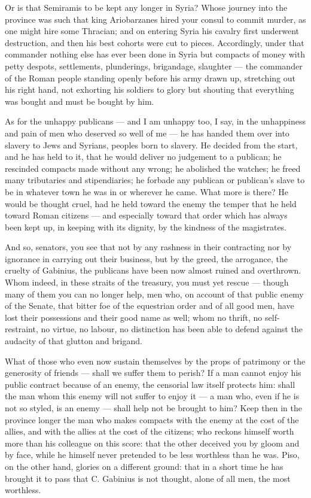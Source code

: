  Or is that Semiramis to be kept any longer in Syria? Whose journey into the province was such that king Ariobarzanes hired your consul to commit murder, as one might hire some Thracian; and on entering Syria his cavalry first underwent destruction, and then his best cohorts were cut to pieces. Accordingly, under that commander nothing else has ever been done in Syria but compacts of money with petty despots, settlements, plunderings, brigandage, slaughter --- the commander of the Roman people standing openly before his army drawn up, stretching out his right hand, not exhorting his soldiers to glory but shouting that everything was bought and must be bought by him.

 As for the unhappy publicans --- and I am unhappy too, I say, in the unhappiness and pain of men who deserved so well of me --- he has handed them over into slavery to Jews and Syrians, peoples born to slavery. He decided from the start, and he has held to it, that he would deliver no judgement to a publican; he rescinded compacts made without any wrong; he abolished the watches; he freed many tributaries and stipendiaries; he forbade any publican or publican's slave to be in whatever town he was in or wherever he came. What more is there? He would be thought cruel, had he held toward the enemy the temper that he held toward Roman citizens --- and especially toward that order which has always been kept up, in keeping with its dignity, by the kindness of the magistrates.

 And so, senators, you see that not by any rashness in their contracting nor by ignorance in carrying out their business, but by the greed, the arrogance, the cruelty of Gabinius, the publicans have been now almost ruined and overthrown. Whom indeed, in these straits of the treasury, you must yet rescue --- though many of them you can no longer help, men who, on account of that public enemy of the Senate, that bitter foe of the equestrian order and of all good men, have lost their possessions and their good name as well; whom no thrift, no self-restraint, no virtue, no labour, no distinction has been able to defend against the audacity of that glutton and brigand.

 What of those who even now sustain themselves by the props of patrimony or the generosity of friends --- shall we suffer them to perish? If a man cannot enjoy his public contract because of an enemy, the censorial law itself protects him: shall the man whom this enemy will not suffer to enjoy it --- a man who, even if he is not so styled, is an enemy --- shall help not be brought to him? Keep then in the province longer the man who makes compacts with the enemy at the cost of the allies, and with the allies at the cost of the citizens; who reckons himself worth more than his colleague on this score: that the other deceived you by gloom and by face, while he himself never pretended to be less worthless than he was. Piso, on the other hand, glories on a different ground: that in a short time he has brought it to pass that C. Gabinius is not thought, alone of all men, the most worthless.

